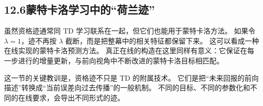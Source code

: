 \documentclass[UTF8,12pt,a4paper,fontset=fandol]{ctexart}
\begin{document}
\begin{center}
\end{center}

\subsection*{12.6\quad 蒙特卡洛学习中的“荷兰迹”}

虽然资格迹通常同 TD 学习联系在一起，但它们也能用于蒙特卡洛方法。
如果令 $\lambda=1$，迹不再按 $\lambda$ 截断，而是把整幕中的相关特征都保留下来。
这可以看成一种在线实现的蒙特卡洛预测方法。
真正在线的构造在这里同样有意义：它保证在每一步进行的增量更新，与前向视角中不断改进的蒙特卡洛目标相匹配。

这一节的关键教训是，资格迹不只是 TD 的附属技术。
它们是把“未来回报的前向描述”转换成“当前误差向过去传播”的一般机制。
不同的目标、不同的参数化和不同的在线要求，会导出不同形式的迹。
\end{document}
